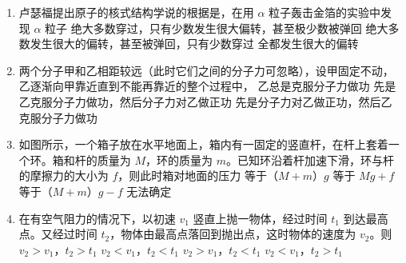\documentclass[\gkver]{gaokaozhenti}
\begin{document}
\begin{enumerate}
\item
卢瑟福提出原子的核式结构学说的根据是，在用 $\alpha$ 粒子轰击金箔的实验中发现 $\alpha$ 粒子
{绝大多数穿过，只有少数发生很大偏转，甚至极少数被弹回}
{绝大多数发生很大的偏转，甚至被弹回，只有少数穿过}
{全都发生很大的偏转}

\item
两个分子甲和乙相距较远（此时它们之间的分子力可忽略），设甲固定不动，乙逐渐向甲靠近直到不能再靠近的整个过程中，
{乙总是克服分子力做功}
{先是乙克服分子力做功，然后分子力对乙做正功}
{先是分子力对乙做正功，然后乙克服分子力做功}

\item
如图所示，一个箱子放在水平地面上，箱内有一固定的竖直杆，在杆上套着一个环。箱和杆的质量为 $M$，环的质量为 $m$。已知环沿着杆加速下滑，环与杆的摩擦力的大小为 $f$，则此时箱对地面的压力
{等于（$M+m$）$g$}
{等于 $Mg+f$}
{等于（$M+m$）$g-f$}
{无法确定}

\item
在有空气阻力的情况下，以初速 $v_{1}$ 竖直上抛一物体，经过时间 $t_{1}$ 到达最高点。又经过时间 $t_{2}$，物体由最高点落回到抛出点，这时物体的速度为 $v_{2}$。则
{$v_{2}>v_{1}$，$t_{2}>t_{1}$}
{$v_{2}<v_{1}$，$t_{2}<t_{1}$}
{$v_{2}>v_{1}$，$t_{2}<t_{1}$}
{$v_{2}<v_{1}$，$t_{2}>t_{1}$}


\end{enumerate}
\end{document}
